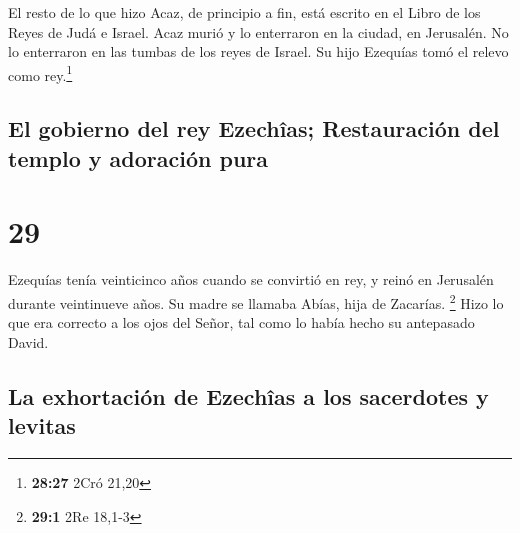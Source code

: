  El resto de lo que hizo Acaz, de principio a fin, está
escrito en el Libro de los Reyes de Judá e Israel.  Acaz
murió y lo enterraron en la ciudad, en Jerusalén. No lo enterraron en
las tumbas de los reyes de Israel. Su hijo Ezequías tomó el relevo como
rey.\footnote{\textbf{28:27} 2Cró 21,20}

\hypertarget{el-gobierno-del-rey-ezechuxeeas-restauraciuxf3n-del-templo-y-adoraciuxf3n-pura}{%
\subsection{El gobierno del rey Ezechîas; Restauración del templo y
adoración
pura}\label{el-gobierno-del-rey-ezechuxeeas-restauraciuxf3n-del-templo-y-adoraciuxf3n-pura}}

\hypertarget{section-28}{%
\section{29}\label{section-28}}

 Ezequías tenía veinticinco años cuando se convirtió en
rey, y reinó en Jerusalén durante veintinueve años. Su madre se llamaba
Abías, hija de Zacarías. \footnote{\textbf{29:1} 2Re 18,1-3}
 Hizo lo que era correcto a los ojos del Señor, tal como
lo había hecho su antepasado David.

\hypertarget{la-exhortaciuxf3n-de-ezechuxeeas-a-los-sacerdotes-y-levitas}{%
\subsection{La exhortación de Ezechîas a los sacerdotes y
levitas}\label{la-exhortaciuxf3n-de-ezechuxeeas-a-los-sacerdotes-y-levitas}}

